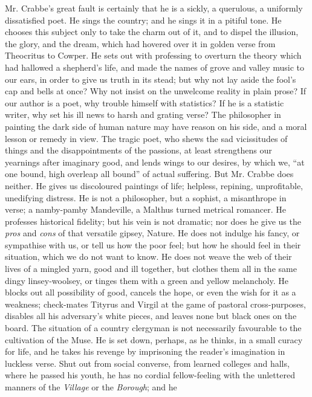 Mr. Crabbe's great fault is certainly that he is a sickly, a querulous,
a uniformly dissatisfied poet. He sings the country; and he sings it in
a pitiful tone. He chooses this subject only to take the charm out of
it, and to dispel the illusion, the glory, and the dream, which had
hovered over it in golden verse from Theocritus to Cowper. He sets out
with professing to overturn the theory which had hallowed a shepherd's
life, and made the names of grove and valley music to our ears, in order
to give us truth in its stead; but why not lay aside the fool's cap and
bells at once? Why not insist on the unwelcome reality in plain prose?
If our author is a poet, why trouble himself with statistics? If he is a
statistic writer, why set his ill news to harsh and grating verse? The
philosopher in painting the dark side of human nature may have reason
on his side, and a moral lesson or remedy in view. The tragic poet, who
shews the sad vicissitudes of things and the disappointments of the
passions, at least strengthens our yearnings after imaginary good, and
lends wings to our desires, by which we, ``at one bound, high overleap
all bound'' of actual suffering. But Mr. Crabbe does neither. He gives
us discoloured paintings of life; helpless, repining, unprofitable,
unedifying distress. He is not a philosopher, but a sophist, a
misanthrope in verse; a namby-pamby Mandeville, a Malthus turned
metrical romancer. He professes historical fidelity; but his vein is not
dramatic; nor does he give us the \emph{pros} and \emph{cons} of that versatile
gipsey, Nature. He does not indulge his fancy, or sympathise with us, or
tell us how the poor feel; but how he should feel in their situation,
which we do not want to know. He does not weave the web of their lives
of a mingled yarn, good and ill together, but clothes them all in the
same dingy linsey-woolsey, or tinges them with a green and yellow
melancholy. He blocks out all possibility of good, cancels the hope, or
even the wish for it as a weakness; check-mates Tityrus and Virgil at
the game of pastoral cross-purposes, disables all his adversary's white
pieces, and leaves none but black ones on the board. The situation of a
country clergyman is not necessarily favourable to the cultivation of
the Muse. He is set down, perhaps, as he thinks, in a small curacy for
life, and he takes his revenge by imprisoning the reader's imagination
in luckless verse. Shut out from social converse, from learned colleges
and halls, where he passed his youth, he has no cordial fellow-feeling
with the unlettered manners of the \emph{Village} or the \emph{Borough}; and he
